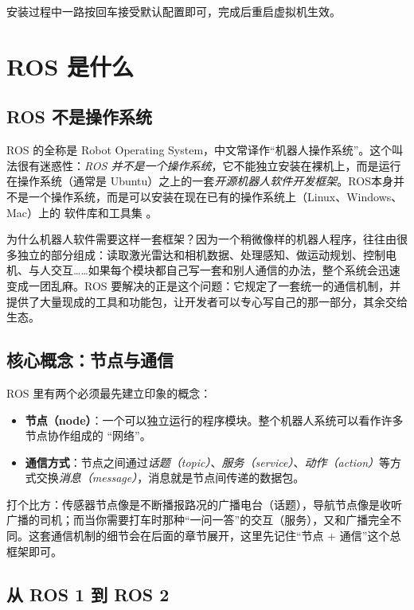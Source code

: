 \documentclass[12pt,a4paper]{ctexbook}
\begin{document}
安装过程中一路按回车接受默认配置即可，完成后重启虚拟机生效。

\section{ROS 是什么}

\subsection{ROS 不是操作系统}

ROS 的全称是 Robot Operating System，中文常译作``机器人操作系统''。这个叫法很有迷惑性：\emph{ROS 并不是一个操作系统}，它不能独立安装在裸机上，而是运行在操作系统（通常是 Ubuntu）之上的一套\emph{开源机器人软件开发框架}。ROS本身并不是一个操作系统，而是可以安装在现在已有的操作系统上（Linux、Windows、Mac）上的 软件库和工具集 。

为什么机器人软件需要这样一套框架？因为一个稍微像样的机器人程序，往往由很多独立的部分组成：读取激光雷达和相机数据、处理感知、做运动规划、控制电机、与人交互……如果每个模块都自己写一套和别人通信的办法，整个系统会迅速变成一团乱麻。ROS 要解决的正是这个问题：它规定了一套统一的通信机制，并提供了大量现成的工具和功能包，让开发者可以专心写自己的那一部分，其余交给生态。

\subsection{核心概念：节点与通信}

ROS 里有两个必须最先建立印象的概念：

\begin{itemize}
    \item \textbf{节点（node）}：一个可以独立运行的程序模块。整个机器人系统可以看作许多节点协作组成的 ``网络''。
    \item \textbf{通信方式}：节点之间通过\emph{话题（topic）}、\emph{服务（service）}、\emph{动作（action）}等方式交换\emph{消息（message）}，消息就是节点间传递的数据包。
\end{itemize}

打个比方：传感器节点像是不断播报路况的广播电台（话题），导航节点像是收听广播的司机；而当你需要打车时那种``一问一答''的交互（服务），又和广播完全不同。这套通信机制的细节会在后面的章节展开，这里先记住``节点 + 通信''这个总框架即可。

\subsection{从 ROS 1 到 ROS 2}
\end{document}
